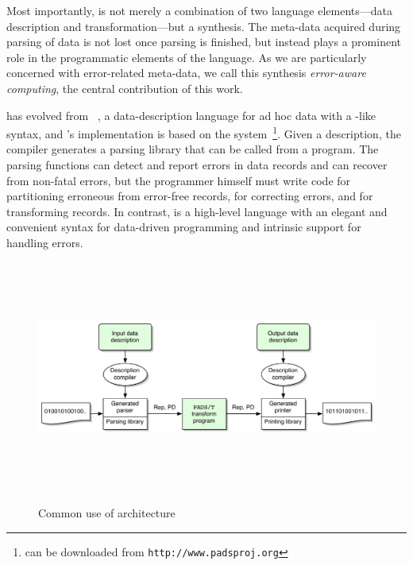 Most importantly, \datatype{} is not merely a combination of two
language elements---data description and transformation---but a
synthesis.  The meta-data acquired during parsing of data is not lost
once parsing is finished, but instead plays a prominent role in the
programmatic elements of the language.  As we are particularly
concerned with error-related meta-data, we call this synthesis
\emph{error-aware computing}, the central contribution of this work. 

\datatype{} has evolved from \pads{}~\cite{fisher+:pads}, a
data-description language for ad hoc data with a \C{}-like syntax, and
\datatype{}'s implementation is based on the \pads{}
system~\footnote{\pads{} can be downloaded from
\texttt{http://www.padsproj.org}}.  Given a \pads{} description, the
\pads{} compiler generates a parsing library that can be called from a
\C{} program.  The parsing functions can detect and report errors in
data records and can recover from non-fatal errors, but the programmer
himself must write \C{} code for partitioning erroneous from error-free
records, for correcting errors, and for transforming records.  In
contrast, \datatype{} is a high-level language with an elegant and
convenient syntax for data-driven programming and intrinsic support
for handling errors.  


\begin{figure}[tp]
\centering
  \includegraphics[height=3in,width=5in]{architecture-grant-pads-t}
\label{fig:pads-arch}
\caption{Common use of \datatype{} architecture}
\end{figure}

